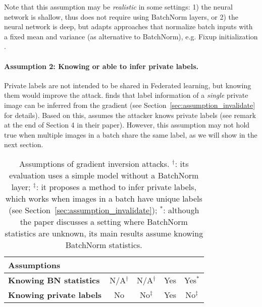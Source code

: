 Note that this assumption may be \textit{realistic} in some settings:  1) the neural network is shallow, thus does not require using BatchNorm layers, or 2) the neural network is deep, but adapts approaches that normalize batch inputs with a fixed mean and variance (as alternative to BatchNorm), e.g. Fixup initialization \citep{zhang2019fixup}.


\paragraph{Assumption 2: Knowing or able to infer private labels.} Private labels are not intended to be shared in Federated learning, but knowing them would improve the attack. \citep{zhao2020idlg} finds that label information of a {\em single} private image can be inferred from the gradient (see Section~\ref{sec:assumption_invalidate} for details). Based on this, \citep{geiping2020inverting} assumes the attacker knows private labels (see remark at the end of Section 4 in their paper).  However, this assumption may not hold true when multiple images in a batch share the same label, as we will show in the next section. 

\begin{table}[t]
    \small
    \centering
    \setlength{\tabcolsep}{3.8pt}
    \begin{tabular}{|l|cccc|}
    \toprule
        {\bf Assumptions} & \citep{zhu2020deep} & \citep{zhao2020idlg} & \citep{geiping2020inverting} & \citep{yin2021see}\\
    \midrule
    {\bf Knowing BN statistics} & N/A$^\dagger$ & N/A$^\dagger$ & Yes & Yes$^*$\\
    {\bf Knowing private labels } &  No & No$^\ddagger$ & Yes & No$^\ddagger$\\
    \bottomrule
    \end{tabular}
    \vspace{2mm}
    \caption{Assumptions of gradient inversion attacks.
    {%
    $^\dagger$: its evaluation uses a simple model without a BatchNorm layer;  $^\ddagger$: it proposes a method to infer private labels, which works when images in a batch have unique labels (see Section~\ref{sec:assumption_invalidate}); $^*$: although the paper discusses a setting where BatchNorm statistics are unknown, its main results assume knowing BatchNorm statistics. 
    }
    }
    \label{tab:assumption_summary}
    \vspace{-3mm}
\end{table}

